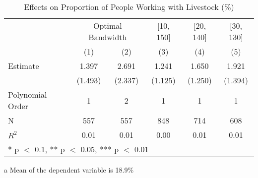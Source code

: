 \begin{table}[!h]

\caption{Effects on Proportion of People Working with Livestock (\%) \label{tab:rdd_livestock}}
\centering
\begin{threeparttable}
\begin{tabular}[t]{lccccc}
\toprule
\multicolumn{1}{c}{} & \multicolumn{2}{c}{Optimal Bandwidth} & \multicolumn{1}{c}{[10, 150]} & \multicolumn{1}{c}{[20, 140]} & \multicolumn{1}{c}{[30, 130]} \\
\cmidrule(l{3pt}r{3pt}){2-3} \cmidrule(l{3pt}r{3pt}){4-4} \cmidrule(l{3pt}r{3pt}){5-5} \cmidrule(l{3pt}r{3pt}){6-6}
  & (1) & (2) & (3) & (4) & (5)\\
\midrule
Estimate & \num{1.397} & \num{2.691} & \num{1.241} & \num{1.650} & \num{1.921}\\
 & (\num{1.493}) & (\num{2.337}) & (\num{1.125}) & (\num{1.250}) & (\num{1.394})\\

\midrule
Polynomial Order & 1 & 2 & 1 & 1 & 1\\
N & \num{557} & \num{557} & \num{848} & \num{714} & \num{608}\\
$R^2$ & \num{0.01} & \num{0.01} & \num{0.00} & \num{0.01} & \num{0.01}\\
\bottomrule
\multicolumn{6}{l}{\rule{0pt}{1em}* p $<$ 0.1, ** p $<$ 0.05, *** p $<$ 0.01}\\
\end{tabular}
\begin{tablenotes}
\item[a] Mean of the dependent variable is 18.9\%
\end{tablenotes}
\end{threeparttable}
\end{table}
